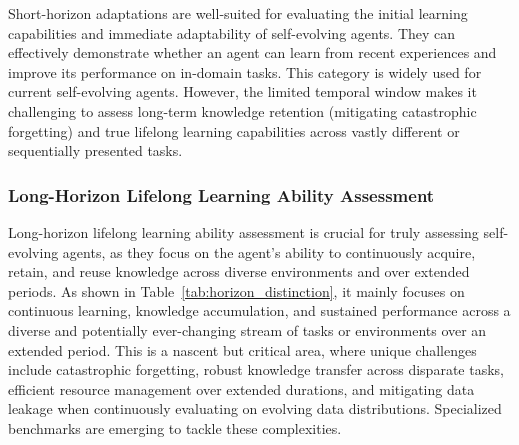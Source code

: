 Short-horizon adaptations are well-suited for evaluating the initial learning capabilities and immediate adaptability of self-evolving agents. They can effectively demonstrate whether an agent can learn from recent experiences and improve its performance on in-domain tasks. This category is widely used for current self-evolving agents. However, the limited temporal window makes it challenging to assess long-term knowledge retention (mitigating catastrophic forgetting) and true lifelong learning capabilities across vastly different or sequentially presented tasks.

\subsubsection{Long-Horizon Lifelong Learning Ability Assessment}
Long-horizon lifelong learning ability assessment is crucial for truly assessing self-evolving agents, as they focus on the agent's ability to continuously acquire, retain, and reuse knowledge across diverse environments and over extended periods. As shown in Table~\ref{tab:horizon_distinction}, it mainly focuses on continuous learning, knowledge accumulation, and sustained performance across a diverse and potentially ever-changing stream of tasks or environments over an extended period.
This is a nascent but critical area, where unique challenges include catastrophic forgetting, robust knowledge transfer across disparate tasks, efficient resource management over extended durations, and mitigating data leakage when continuously evaluating on evolving data distributions. Specialized benchmarks are emerging to tackle these complexities.

